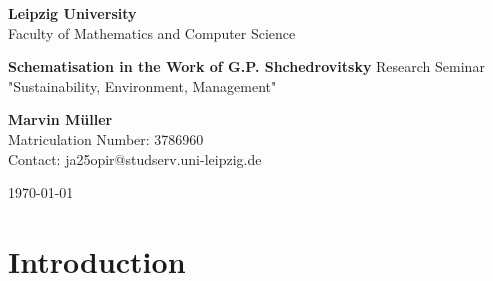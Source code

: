 \documentclass[11pt,a4paper]{article}
\begin{document}
\begin{titlepage}
\begin{large}
\begin{center}

\textbf{Leipzig University}\\[5pt]
Faculty of Mathematics and Computer Science \\


\vskip 4cm

{\Large \textbf{Schematisation in the Work of G.P. Shchedrovitsky}}
\vskip 0.3cm
Research Seminar "Sustainability, Environment, Management"

\vfill

\textbf{Marvin M\"uller}\\[6pt]
Matriculation Number: 3786960\\
Contact: ja25opir@studserv.uni-leipzig.de\\

\vskip 1cm

\today
\end{center}

\end{large}
\end{titlepage}
\newpage




\thispagestyle{empty}
\tableofcontents
\newpage


\section{Introduction}
\end{document}
